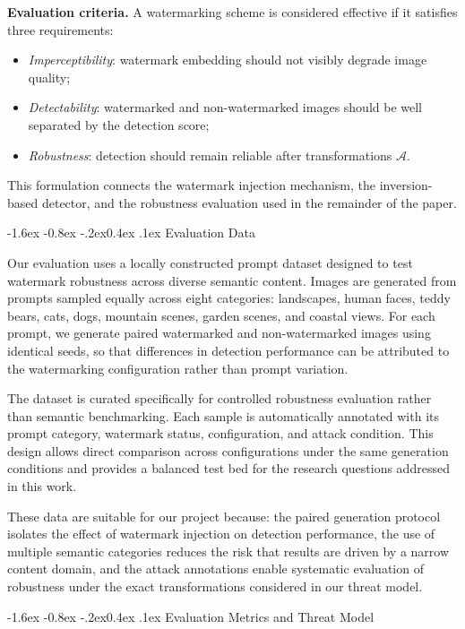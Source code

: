\documentclass[10pt,twocolumn]{article}
\makeatletter
\renewcommand\subsection{\@startsection{subsection}{2}{\z@}%
  {-1.6ex \@plus -0.8ex \@minus -.2ex}{0.4ex \@plus .1ex}%
  {\normalfont\normalsize\itshape}}
\makeatother
\begin{document}
\textbf{Evaluation criteria.}
A watermarking scheme is considered effective if it satisfies three
requirements:
\begin{itemize}
    \item \textit{Imperceptibility}: watermark embedding should not
    visibly degrade image quality;
    \item \textit{Detectability}: watermarked and non-watermarked
    images should be well separated by the detection score;
    \item \textit{Robustness}: detection should remain reliable after
    transformations $\mathcal{A}$.
\end{itemize}

This formulation connects the watermark injection mechanism, the
inversion-based detector, and the robustness evaluation used in the
remainder of the paper.

\subsection{Evaluation Data}

Our evaluation uses a locally constructed prompt dataset designed to
test watermark robustness across diverse semantic content.
Images are generated from prompts sampled equally across eight categories:
landscapes, human faces, teddy bears, cats, dogs, mountain scenes,
garden scenes, and coastal views.
For each prompt, we generate paired watermarked and non-watermarked
images using identical seeds, so that differences in detection
performance can be attributed to the watermarking configuration rather
than prompt variation.

The dataset is curated specifically for controlled robustness
evaluation rather than semantic benchmarking.
Each sample is automatically annotated with its prompt category,
watermark status, configuration, and attack condition.
This design allows direct comparison across configurations under the
same generation conditions and provides a balanced test bed for the
research questions addressed in this work.

These data are suitable for our project because:
the paired generation protocol isolates the effect of watermark
injection on detection performance, the use of multiple 
semantic categories reduces the risk that
results are driven by a narrow content domain, and the attack 
annotations enable systematic evaluation of
robustness under the exact transformations considered in our threat
model.

\subsection{Evaluation Metrics and Threat Model}
\end{document}
